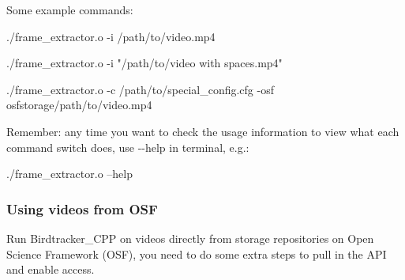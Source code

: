 Some example commands\+:


\begin{DoxyCode}
./frame\_extractor.o -i /path/to/video.mp4
\end{DoxyCode}
 
\begin{DoxyCode}
./frame\_extractor.o -i "/path/to/video with spaces.mp4"
\end{DoxyCode}



\begin{DoxyCode}
./frame\_extractor.o -c /path/to/special\_config.cfg -osf osfstorage/path/to/video.mp4
\end{DoxyCode}


Remember\+: any time you want to check the usage information to view what each command switch does, use {\ttfamily -\/-\/help} in terminal, e.\+g.\+:


\begin{DoxyCode}
./frame\_extractor.o --help
\end{DoxyCode}


\subsubsection*{Using videos from O\+SF}

Run Birdtracker\+\_\+\+C\+PP on videos directly from storage repositories on Open Science Framework (O\+SF), you need to do some extra steps to pull in the A\+PI and enable access.


